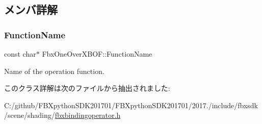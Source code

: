 \subsection{メンバ詳解}
\mbox{\label{class_fbx_one_over_x_b_o_f_a17b7276cdb45a9c396edc78b33a6a9c7}} 
\subsubsection{\texorpdfstring{Function\+Name}{FunctionName}}
{\footnotesize\ttfamily const char$\ast$ Fbx\+One\+Over\+X\+B\+O\+F\+::\+Function\+Name\hspace{0.3cm}{\ttfamily [static]}}



Name of the operation function. 



このクラス詳解は次のファイルから抽出されました\+:\begin{DoxyCompactItemize}
\item 
C\+:/github/\+F\+B\+Xpython\+S\+D\+K201701/\+F\+B\+Xpython\+S\+D\+K201701/2017./include/fbxsdk/scene/shading/\hyperlink{fbxbindingoperator_8h}{fbxbindingoperator.\+h}\end{DoxyCompactItemize}
